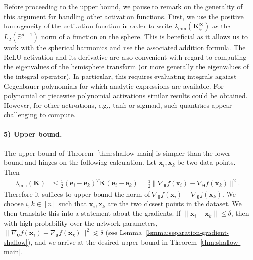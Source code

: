 \documentclass{article}
\theoremstyle{definition}
\renewcommand{\S}{\mathbb{S}}
\def\vtheta{{\bm{\theta}}}
\def\ve{{\bm{e}}}
\def\vx{{\bm{x}}}
\def\mK{{\bm{K}}}
\begin{document}
Before proceeding to the upper bound, we pause to remark on the generality of this argument for handling other activation functions. First, we use the positive homogeneity of the activation function in order to write $\lambda_{\min}(\mK_{\psi}^{\infty})$ as the $L_2(\S^{d-1})$ norm of a function on the sphere. This is beneficial as it allows us to work with the spherical harmonics and use the associated addition formula. The ReLU activation and its derivative are also convenient with regard to computing the eigenvalues of the hemisphere transform (or more generally the eigenvalues of the integral operator). In particular, this requires evaluating integrals against Gegenbauer polynomials for which analytic expressions are available. For polynomial or piecewise polynomial activations similar results could be obtained. However, for other activations, e.g., tanh or sigmoid, such quantities appear challenging to compute.


\paragraph{5) Upper bound.} 
The upper bound of Theorem~\ref{thm:shallow-main} is simpler than the lower bound and hinges on the following calculation. Let $\vx_i, \vx_k$ be two data points. Then
\begin{align*}
    \lambda_{\min}(\mK) &\leq \frac{1}{2} (\ve_i - \ve_k)^T \mK (\ve_i - \ve_k)  = \frac{1}{2}\|\nabla_{\vtheta}f(\vx_i) - \nabla_{\vtheta}f(\vx_k)\|^2.
\end{align*}
Therefore it suffices to upper bound the norm of $\nabla_{\vtheta} f(\vx_i) - \nabla_{\vtheta} f(\vx_k)$. We choose $i, k \in [n]$ such that $\vx_i, \vx_k$ are the two closest points in the dataset. We then translate this into a statement about the gradients. If $\|\vx_i - \vx_k\| \leq \delta$, then with high probability over the network parameters, $\|\nabla_{\vtheta} f(\vx_i) - \nabla_{\vtheta} f(\vx_k)\|^2 \lesssim \delta$ (see Lemma~\ref{lemma:separation-gradient-shallow}), and we arrive at the desired upper bound in Theorem~\ref{thm:shallow-main}. 
\end{document}
